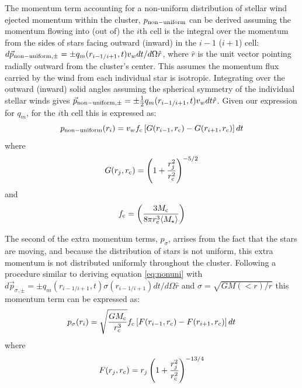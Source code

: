 \documentclass[fleqn,usenatbib]{mnras}
\begin{document}
 The momentum term accounting for a non-uniform distribution of stellar wind ejected momentum within the cluster, $p_{\rm non-uniform}$ can be derived assuming the momentum flowing into (out of) the $i$th cell is the integral over the momentum from the sides of stars facing outward (inward) in the $i-1$ ($i+1$) cell: $d\vec{p}_{{\rm non-uniform},\pm} = \pm q_m(r_{i-1/i+1},t) v_w dt/d\Omega \hat{r}$, where $\hat{r}$ is the unit vector pointing radially outward from the cluster's center.  This assumes the momentum flux carried by the wind from each individual star is isotropic. Integrating over the outward (inward) solid angles assuming the spherical symmetry of the individual stellar winds gives $\vec{p}_{\rm{non-uniform},\pm} = \pm \frac{1}{2} q_m(r_{i-1/i+1},t) v_w dt \hat{r}$.  Given our expression for $q_m$, for the $i$th cell this is expressed as:
\begin{equation}
p_{\rm non-uniform}(r_i) = 
v_w f_{\rm c} \left[G(r_{i-1},r_{\rm c}) - G(r_{i+1}, r_{\rm c})  \right] dt
\label{eq:nonuni}
\end{equation}
where
\begin{equation}
G(r_j, r_{\rm c}) = \left( 1 + \frac{r_{j}^2}{r_{\rm c}^2} \right)^{-5/2} 
\end{equation}
and
\begin{equation}
f_{\rm c} = \left( \frac{3 M_{\rm c}}{8 \pi r_{\rm c}^3 \langle M_\star \rangle} \right)
\end{equation}

 The second of the extra momentum terms, $p_\sigma$, arrises from the fact that the stars are moving, and because the distribution of stars is not uniform, this extra momentum is not distributed uniformly throughout the cluster.  Following a procedure similar to deriving equation \ref{eq:nonuni} with $d\vec{p}_{\sigma,\pm} = \pm q_m(r_{i-1/i+1},t) \sigma(r_{i-1/i+1}) dt/d\Omega \hat{r}$ and $\sigma = \sqrt{G M(<r)/r}$ this momentum term can be expressed as:
\begin{equation}
p_\sigma(r_i) = \sqrt{\frac{G M_{\rm c}}{r_{\rm c}^3}} f_{\rm c}
\left[F(r_{i-1}, r_{\rm c}) - F(r_{i+1}, r_{\rm c})\right] dt
\end{equation}
where
\begin{equation}
F(r_j, r_{\rm c}) =  r_j \left( 1 + \frac{r_j^2}{r_{\rm c}^2} \right)^{-13/4}
\end{equation}
\end{document}
